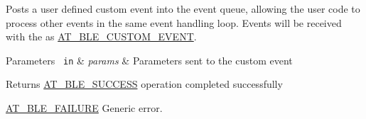 Posts a user defined custom event into the event queue, allowing the user code to process other events in the same event handling loop. Events will be received with the as \mbox{\hyperlink{at__ble__api_8h_a3324640b95f33169515f89738ed5baeba2c2e832242a618195900984a4abec3e9}{A\+T\+\_\+\+B\+L\+E\+\_\+\+C\+U\+S\+T\+O\+M\+\_\+\+E\+V\+E\+NT}}. 


\begin{DoxyParams}[1]{Parameters}
\mbox{\texttt{ in}}  & {\em params} & Parameters sent to the custom event\\
\hline
\end{DoxyParams}
\begin{DoxyReturn}{Returns}
\mbox{\hyperlink{group__error__codes__group_gga3b1db9b95feb157b3c188ca27fe76988a7e3bfff5387331cd4f2c56cbcbbd7e19}{A\+T\+\_\+\+B\+L\+E\+\_\+\+S\+U\+C\+C\+E\+SS}} operation completed successfully 

\mbox{\hyperlink{group__error__codes__group_gga3b1db9b95feb157b3c188ca27fe76988ac345aa57ea63207c65158bfac760799c}{A\+T\+\_\+\+B\+L\+E\+\_\+\+F\+A\+I\+L\+U\+RE}} Generic error. 
\end{DoxyReturn}
